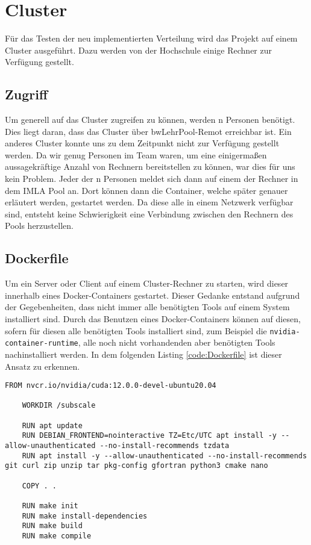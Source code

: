 \section{Cluster}

Für das Testen der neu implementierten Verteilung wird das Projekt auf einem Cluster ausgeführt. Dazu werden von der Hochschule einige Rechner zur Verfügung gestellt.

\subsection{Zugriff}

Um generell auf das Cluster zugreifen zu können, werden n Personen benötigt. Dies liegt daran, dass das Cluster über bwLehrPool-Remot erreichbar ist. Ein anderes Cluster konnte uns zu dem Zeitpunkt nicht zur Verfügung gestellt werden. Da wir genug Personen im Team waren, um eine einigermaßen aussagekräftige Anzahl von Rechnern bereitstellen zu können, war dies für uns kein Problem. Jeder der n Personen meldet sich dann auf einem der Rechner in dem IMLA Pool an. Dort können dann die Container, welche später genauer erläutert werden, gestartet werden. Da diese alle in einem Netzwerk verfügbar sind, entsteht keine Schwierigkeit eine Verbindung zwischen den Rechnern des Pools herzustellen.

\subsection{Dockerfile}

Um ein Server oder Client auf einem Cluster-Rechner zu starten, wird dieser innerhalb eines Docker-Containers gestartet. Dieser Gedanke entstand aufgrund der Gegebenheiten, dass nicht immer alle benötigten Tools auf einem System installiert sind. Durch das Benutzen eines Docker-Containers können auf diesen, sofern für diesen alle benötigten Tools installiert sind, zum Beispiel die \verb|nvidia-container-runtime|, alle noch nicht vorhandenden aber benötigten Tools nachinstalliert werden. In dem folgenden Listing \ref{code:Dockerfile} ist dieser Ansatz zu erkennen.

\begin{lstlisting}[caption=Dockerfile, label={code:Dockerfile}, captionpos=b]
    FROM nvcr.io/nvidia/cuda:12.0.0-devel-ubuntu20.04

    WORKDIR /subscale
    
    RUN apt update
    RUN DEBIAN_FRONTEND=nointeractive TZ=Etc/UTC apt install -y --allow-unauthenticated --no-install-recommends tzdata
    RUN apt install -y --allow-unauthenticated --no-install-recommends git curl zip unzip tar pkg-config gfortran python3 cmake nano
    
    COPY . .
    
    RUN make init
    RUN make install-dependencies
    RUN make build
    RUN make compile

\end{lstlisting}

